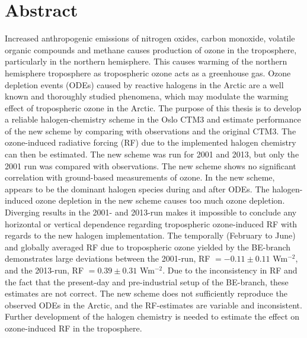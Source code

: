 \chapter*{Abstract}



Increased anthropogenic emissions of nitrogen oxides, carbon monoxide, volatile organic compounds and methane causes production of ozone in the troposphere, particularly in the northern hemisphere. This causes warming of the northern hemisphere troposphere as tropospheric ozone acts as a greenhouse gas. Ozone depletion events (ODEs) caused by reactive halogens in the Arctic are a well known and thoroughly studied phenomena, which may modulate the warming effect of tropospheric ozone in the Arctic. The purpose of this thesis is to develop a reliable halogen-chemistry scheme in the Oslo CTM3 and estimate performance of the new scheme by comparing with observations and the original CTM3. The ozone-induced radiative forcing (RF) due to the implemented halogen chemistry can then be estimated. The new scheme was run for 2001 and 2013, but only the 2001 run was compared with observations. The new scheme shows no significant correlation with ground-based measurements of ozone. In the new scheme,  appears to be the dominant halogen species during and after ODEs. The halogen-induced ozone depletion in the new scheme causes too much ozone depletion. Diverging results in the 2001- and 2013-run makes it impossible to conclude any horizontal or vertical dependence regarding tropospheric ozone-induced RF with regards to the new halogen implementation. The temporally (February to June) and globally averaged RF due to tropospheric ozone yielded by the BE-branch demonstrates large deviations between the 2001-run, RF $=-0.11\pm0.11$ Wm$^{-2}$, and the 2013-run, RF $= 0.39\pm0.31$ Wm$^{-2}$. Due to the inconsistency in RF and the fact that the present-day and pre-industrial setup of the BE-branch, these estimates are not correct. The new scheme does not sufficiently reproduce the observed ODEs in the Arctic, and the RF-estimates are variable and inconsistent. Further development of the halogen chemistry is needed to estimate the effect on ozone-induced RF in the troposphere. 
\cleardoublepage

